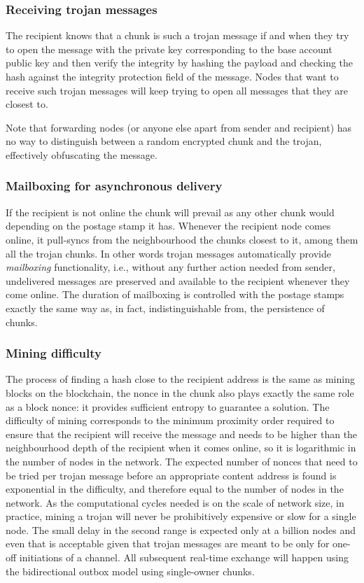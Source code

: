\subsubsection{Receiving trojan messages}

The recipient knows that a chunk is such a trojan message if and when they try to open the message with the private key corresponding to the base account public key and then verify the integrity by hashing the payload and checking the hash against the integrity protection field of the message. 
Nodes that want to receive such trojan messages will keep trying to open all messages that they are closest to.

Note that forwarding nodes (or anyone else apart from sender and recipient) has no way to distinguish between a random encrypted chunk and the trojan, effectively obfuscating the message.  

\subsubsection{Mailboxing for asynchronous delivery}

If the recipient is not online the chunk will prevail as any other chunk would depending on the postage stamp it has. Whenever the recipient node comes online, it pull-syncs from the neighbourhood the chunks closest to it, among them all the trojan chunks. In other words trojan messages automatically provide \emph{mailboxing} functionality, i.e., 
without any further action needed from sender, undelivered messages are preserved and available to the recipient whenever they come online. The duration of mailboxing is controlled with the postage stamps exactly the same way as, in fact, indistinguishable from, the persistence of chunks. 

\subsubsection{Mining difficulty}

The process of finding a hash close to the recipient address is the same as mining blocks on the blockchain, the nonce in the chunk also plays exactly the same role as a block nonce: it provides sufficient entropy to guarantee a solution. The difficulty of mining corresponds to the minimum proximity order required to ensure that the recipient will receive the message and needs to be higher than the neighbourhood depth of the recipient when it comes online, so it is logarithmic in the number of nodes in the network. The expected number of nonces that need to be tried per trojan message before an appropriate content address is found is exponential in the difficulty, and therefore equal to the number of nodes in the network. As the computational cycles needed is on the scale of network size, in practice, mining a trojan 
will never be prohibitively expensive or slow for a single node. The small delay in the second range is expected only at a billion nodes and even that is acceptable given that trojan messages are meant to be only for one-off initiations of a channel. All subsequent real-time exchange will happen using the bidirectional outbox model using single-owner chunks.

